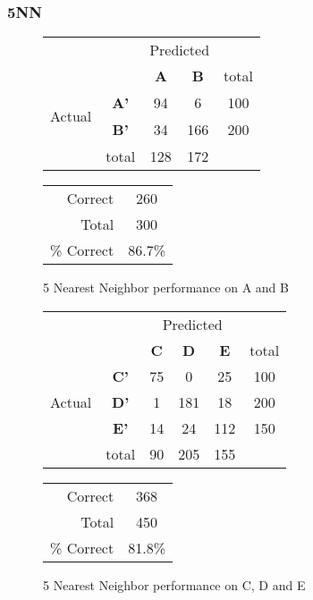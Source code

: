 \subsubsection{5NN}
\begin{figure}[!ht]
\begin{minipage}[b]{0.5\linewidth}
\centering
	\begin{tabular}{ccc|c|c}
	 & &\multicolumn{2}{c}{Predicted} &\\
	  & & \bf{A} &  \bf{B} & total \\
	 \cline{3-5}
	 \multirow{2}{*}{\begin{sideways}Actual\end{sideways}} & \bf{A'}& 94 & 6 & 100 \\
	 \cline{3-5}
	 & \bf{B'}& 34 & 166 & 200 \\
	  \cline{3-5}
	 &total&128&172\\
	\end{tabular}
\end{minipage}
\hspace{0.5cm}
\begin{minipage}[b]{0.5\linewidth}
	\begin{tabular}{r|c}
	\hline
	Correct& 260\\
	Total& 300\\
	\hline
	\% Correct& 86.7\%\\
	\hline
	\end{tabular}
\end{minipage}
\vspace{1mm}
\caption{5 Nearest Neighbor performance on A and B}
\end{figure}

	
\begin{figure}[!ht]
\begin{minipage}[b]{0.5\linewidth}
\centering
	\begin{tabular}{ccc|c|c|c}
	 & &\multicolumn{3}{c}{Predicted} &\\
	  & & \bf{C} &  \bf{D} & \bf{E} & total \\
	 \cline{3-5}
	 \multirow{3}{*}{\begin{sideways}Actual\end{sideways}} & \bf{C'}& 75 & 0 & 25 & 100\\
	 \cline{3-6}
	 & \bf{D'}& 1 & 181 & 18 & 200\\
	  \cline{3-6}
	 & \bf{E'}& 14 & 24 & 112 &  150\\
	  \cline{3-6}
	 &total&90&205&155\\
	\end{tabular}
\end{minipage}
\hspace{0.5cm}
\begin{minipage}[b]{0.5\linewidth}
	\begin{tabular}{r|c}
	\hline
	Correct& 368\\
	Total& 450\\
	\hline
	\% Correct& 81.8\%\\
	\hline
	\end{tabular}
\end{minipage}
\vspace{1mm}
\caption{5 Nearest Neighbor performance on C, D and E}
\end{figure}
 
 
\clearpage
